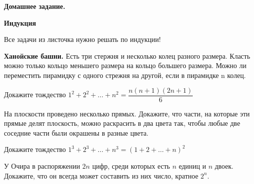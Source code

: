 \centerline{\bf \Huge Домашнее задание.}
\centerline{\bf \Huge Индукция}

\begin{flushright}
        \scriptsize{Все задачи из листочка нужно решать по индукции!}
\end{flushright}

\textbf{Ханойские башни.} Есть три стержня и несколько колец разного размера. Класть можно только кольцо меньшего размера на кольцо большего размера. Можно ли переместить пирамидку с одного стрежня на другой, если в пирамидке n колец.

Докажите тождество $1^2 + 2^2 + \ldots + n^2 = \dfrac{n(n+1)(2n+1)}{6}$


На плоскости проведено несколько прямых. Докажите, что части, на которые эти прямые делят плоскость, можно раскрасить в два цвета так, чтобы любые две соседние части были окрашены в разные цвета.

Докажите тождество $1^3 + 2^3 + \ldots + n^3 = (1 + 2 + \ldots + n)^2$

У Очира в распоряжении $2n$ цифр, среди которых есть $n$ единиц и $n$ двоек. Докажите, что он всегда может составить из них число, кратное $2^n$.